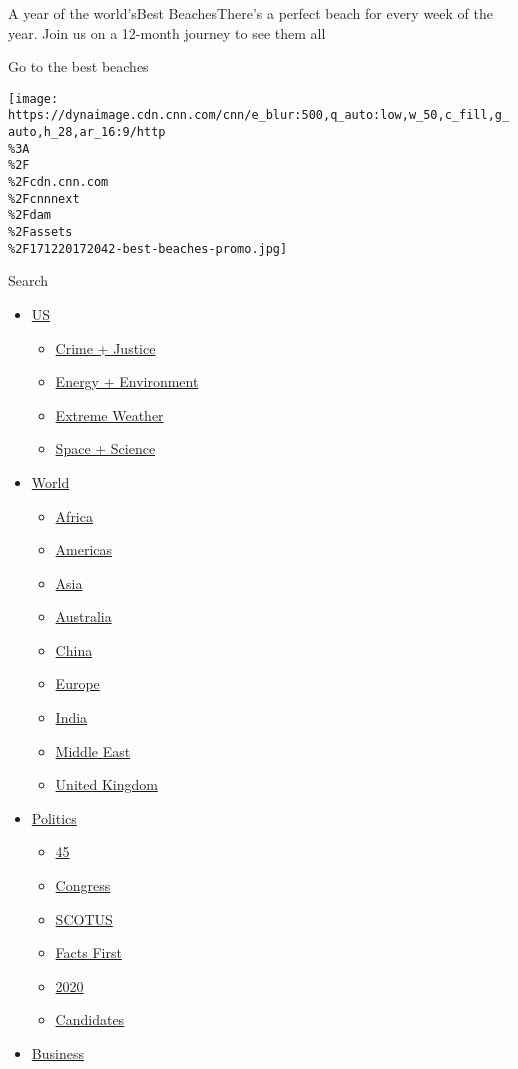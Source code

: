 \href{//www.cnn.com/interactive/travel/best-beaches}{}

A year of the world'sBest BeachesThere's a perfect beach for every week
of the year. Join us on a 12-month journey to see them all

Go to the best beaches

\texttt{[image: https://dynaimage.cdn.cnn.com/cnn/e\_blur:500,q\_auto:low,w\_50,c\_fill,g\_auto,h\_28,ar\_16:9/http\\\%3A\\\%2F\\\%2Fcdn.cnn.com\\\%2Fcnnnext\\\%2Fdam\\\%2Fassets\\\%2F171220172042-best-beaches-promo.jpg]}

Search

\begin{itemize}
\tightlist
\item
  \href{/us}{US}

  \begin{itemize}
  \tightlist
  \item
    \href{/specials/us/crime-and-justice}{Crime + Justice}
  \item
    \href{/specials/us/energy-and-environment}{Energy + Environment}
  \item
    \href{/specials/us/extreme-weather}{Extreme Weather}
  \item
    \href{/specials/space-science}{Space + Science}
  \end{itemize}
\item
  \href{/world}{World}

  \begin{itemize}
  \tightlist
  \item
    \href{/africa}{Africa}
  \item
    \href{/americas}{Americas}
  \item
    \href{/asia}{Asia}
  \item
    \href{/australia}{Australia}
  \item
    \href{/china}{China}
  \item
    \href{/europe}{Europe}
  \item
    \href{/india}{India}
  \item
    \href{/middle-east}{Middle East}
  \item
    \href{/uk}{United Kingdom}
  \end{itemize}
\item
  \href{/politics}{Politics}

  \begin{itemize}
  \tightlist
  \item
    \href{/specials/politics/president-donald-trump-45}{45}
  \item
    \href{/specials/politics/congress-capitol-hill}{Congress}
  \item
    \href{/specials/politics/supreme-court-nine}{SCOTUS}
  \item
    \href{/specials/politics/fact-check-politics}{Facts First}
  \item
    \href{/specials/politics/2020-election-coverage}{2020}
  \item
    \href{/election/2020/candidates}{Candidates}
  \end{itemize}
\item
  \href{/business}{Business}


\end{itemize}
